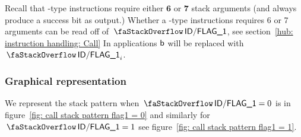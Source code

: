 Recall that -type instructions require either $\bm{6}$ or $\bm{7}$ stack arguments (and always produce a success bit as output.)
Whether a -type instructions requires 6 or 7 arguments can be read off of $\decFlag{1}$, see section~\ref{hub: instruction handling: Call}
In applications $\textsf{b}$ will be replaced with $\decFlag{1}_{i}$.


\subsubsection{Graphical representation}


We represent the stack pattern when $\decFlag{1}=0$ is in figure~\ref{fig: call stack pattern flag1 = 0} and similarly for $\decFlag{1}=1$ see figure~\ref{fig: call stack pattern flag1 = 1}.
